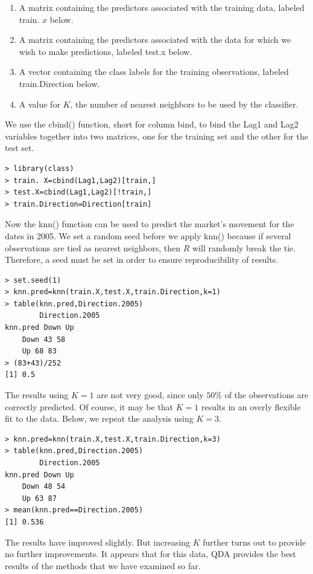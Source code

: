 \documentclass[10pt]{article}
\begin{document}
\begin{enumerate}
  \item A matrix containing the predictors associated with the training data, labeled train. $x$ below.
  \item A matrix containing the predictors associated with the data for which we wish to make predictions, labeled test.x below.
  \item A vector containing the class labels for the training observations, labeled train.Direction below.
  \item A value for $K$, the number of nearest neighbors to be used by the classifier.
\end{enumerate}

We use the cbind() function, short for column bind, to bind the Lag1 and Lag2 variables together into two matrices, one for the training set and the other for the test set.

\begin{verbatim}
> library(class)
> train. X=cbind(Lag1,Lag2)[train,]
> test.X=cbind(Lag1,Lag2)[!train,]
> train.Direction=Direction[train]
\end{verbatim}

Now the knn() function can be used to predict the market's movement for the dates in 2005. We set a random seed before we apply knn() because if several observations are tied as nearest neighbors, then $R$ will randomly break the tie. Therefore, a seed must be set in order to ensure reproducibility of results.

\begin{verbatim}
> set.seed(1)
> knn.pred=knn(train.X,test.X,train.Direction,k=1)
> table(knn.pred,Direction.2005)
        Direction.2005
knn.pred Down Up
    Down 43 58
    Up 68 83
> (83+43)/252
[1] 0.5
\end{verbatim}

The results using $K=1$ are not very good, since only $50 \%$ of the observations are correctly predicted. Of course, it may be that $K=1$ results in an overly flexible fit to the data. Below, we repeat the analysis using $K=3$.

\begin{verbatim}
> knn.pred=knn(train.X,test.X,train.Direction,k=3)
> table(knn.pred,Direction.2005)
        Direction.2005
knn.pred Down Up
    Down 48 54
    Up 63 87
> mean(knn.pred==Direction.2005)
[1] 0.536
\end{verbatim}

The results have improved slightly. But increasing $K$ further turns out to provide no further improvements. It appears that for this data, QDA provides the best results of the methods that we have examined so far.
\end{document}
